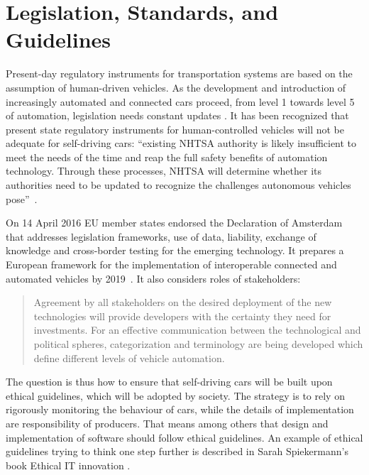 \section{Legislation, Standards, and Guidelines}
\label{sec:LegislationStandardGuidelines}

Present-day regulatory instruments for transportation systems are based on the assumption of human-driven vehicles. As the development and introduction of increasingly automated and connected cars proceed, from level 1 towards level 5 of automation, legislation needs constant updates \cite{EthicsCommission2017pr,EthicsCommission2017b,Pillath2016,NHTSA2016PolicyUpdate}. It has been recognized that present state regulatory instruments for human-controlled vehicles will not be adequate for self-driving cars: \enquote{existing NHTSA authority is likely insufficient to meet the needs of the time and reap the full safety benefits of automation technology. Through these processes, NHTSA will determine whether its authorities need to be updated to recognize the challenges autonomous vehicles pose}~\cite{NHTSA2016PolicyUpdate}. %

On 14 April 2016 EU member states endorsed the Declaration of Amsterdam \cite{GovernmentNL2017} that addresses legislation frameworks, use of data, liability, exchange of knowledge and cross-border testing for the emerging technology. It prepares a European framework for the implementation of interoperable connected and automated vehicles by 2019~\cite{EthicsCommission2017b}. It also considers roles of stakeholders:

 \begin{quote}
 Agreement by all stakeholders on the desired deployment of the new technologies will provide developers with the certainty they need for investments. For an effective communication between the technological and political spheres, categorization and terminology are being developed which define different levels of vehicle automation. \cite{Pillath2016} %
 \end{quote} %
 
The question is thus how to ensure that self-driving cars will be built upon ethical guidelines, which will be adopted by society. The strategy is to rely on rigorously monitoring the behaviour of cars, while the details of implementation are  responsibility of producers. That means among others that design and implementation of software should follow ethical guidelines. An example of ethical guidelines trying to think one step further is described in Sarah Spiekermann's book Ethical IT innovation \cite{spiekermann2015ethical}. 


